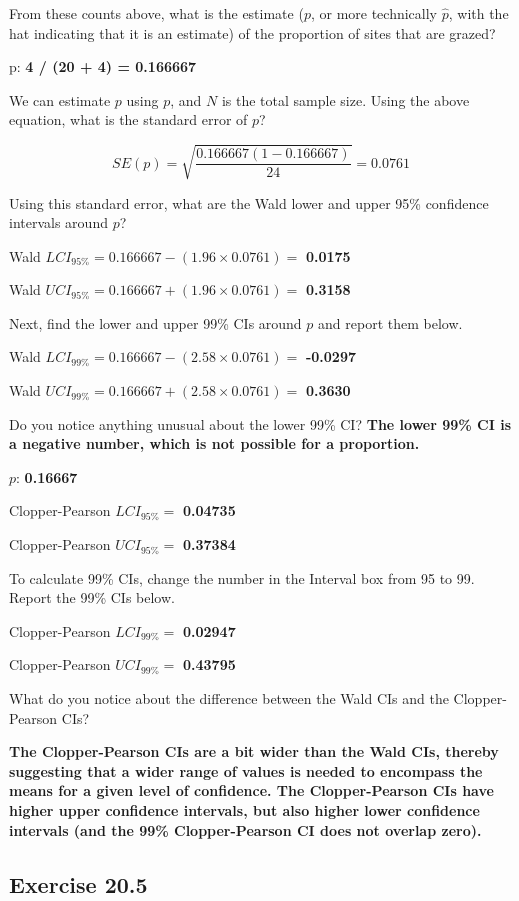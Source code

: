 \documentclass[
]{scrbook}
\begin{document}
From these counts above, what is the estimate (\(p\), or more technically \(\hat{p}\), with the hat indicating that it is an estimate) of the proportion of sites that are grazed?

p: \textbf{4 / (20 + 4) = 0.166667}

We can estimate \(p\) using \(p\), and \(N\) is the total sample size. Using the above equation, what is the standard error of \(p\)?

\[SE(p) = \sqrt{\frac{0.166667(1 - 0.166667)}{24}} = 0.0761\]

Using this standard error, what are the Wald lower and upper 95\% confidence intervals around \(p\)?

Wald \(LCI_{95\%} = 0.166667 - (1.96 \times 0.0761) =\) \textbf{0.0175}

Wald \(UCI_{95\%} = 0.166667 + (1.96 \times 0.0761) =\) \textbf{0.3158}

Next, find the lower and upper 99\% CIs around \(p\) and report them below.

Wald \(LCI_{99\%} = 0.166667 - (2.58 \times 0.0761) =\) \textbf{-0.0297}

Wald \(UCI_{99\%} = 0.166667 + (2.58 \times 0.0761) =\) \textbf{0.3630}

Do you notice anything unusual about the lower 99\% CI? \textbf{The lower 99\% CI is a negative number, which is not possible for a proportion.}

\(p\): \textbf{0.16667}

Clopper-Pearson \(LCI_{95\%} =\) \textbf{0.04735}

Clopper-Pearson \(UCI_{95\%} =\) \textbf{0.37384}

To calculate 99\% CIs, change the number in the Interval box from 95 to 99.
Report the 99\% CIs below.

Clopper-Pearson \(LCI_{99\%} =\) \textbf{0.02947}

Clopper-Pearson \(UCI_{99\%} =\) \textbf{0.43795}

What do you notice about the difference between the Wald CIs and the Clopper-Pearson CIs?

\textbf{The Clopper-Pearson CIs are a bit wider than the Wald CIs, thereby suggesting that a wider range of values is needed to encompass the means for a given level of confidence. The Clopper-Pearson CIs have higher upper confidence intervals, but also higher lower confidence intervals (and the 99\% Clopper-Pearson CI does not overlap zero).}

\hypertarget{exercise-20.5}{%
\subsection{Exercise 20.5}\label{exercise-20.5}}
\end{document}
